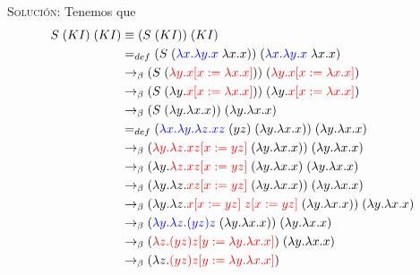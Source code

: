 \documentclass[letterpaper,11pt]{article}
\begin{document}
\begin{enumerate}
\begin{enumerate}
        \textsc{Solución:} Tenemos que 
        \begin{align*}
            S \; (KI) \; (KI) 
            &\equiv (S \; (KI)) \; (KI) \\ 
            &=_{def} (S \; (\textcolor{blue}{\lambda x. \lambda y.x} \; 
                            \lambda x.x)) \;
                           (\textcolor{blue}{\lambda x. \lambda y.x} \; 
                            \lambda x.x) \\
            &\rightarrow_{\beta}
            (S \; (\textcolor{red}{\lambda y.x [x := \lambda x.x]})) \;
            (\textcolor{red}{\lambda y.x [x := \lambda x.x]}) \\
            &\rightarrow_{\beta}
            (S \; (\lambda y. \textcolor{red}{x [x := \lambda x.x]})) \; 
            (\lambda y. \textcolor{red}{x [x := \lambda x.x]}) \\
            &\rightarrow_{\beta} 
            (S \; (\lambda y. \lambda x.x)) \; (\lambda y. \lambda x.x) \\
            &=_{def} (\textcolor{blue}{\lambda x. \lambda y. \lambda z.xz} \; 
                     (yz) \; (\lambda y. \lambda x.x)) \; 
                     (\lambda y. \lambda x.x) \\
            &\rightarrow_{\beta}
            (\textcolor{red}{\lambda y. \lambda z.xz [x := yz]} \; 
            (\lambda y. \lambda x.x)) \; (\lambda y. \lambda x.x) \\
            &\rightarrow_{\beta}
            (\lambda y. \textcolor{red}{\lambda z.xz [x := yz]} \; 
            (\lambda y. \lambda x.x) \; (\lambda y. \lambda x.x) \\ 
            &\rightarrow_{\beta}
            (\lambda y. \lambda z. \textcolor{red}{xz [x := yz]} \; 
            (\lambda y. \lambda x.x)) \; (\lambda y. \lambda x.x) \\
            &\rightarrow_{\beta}
            (\lambda y. \lambda z. \textcolor{red}{x [x := yz] \; z [x := yz]} 
            \; (\lambda y. \lambda x.x)) \; (\lambda y. \lambda x.x) \\
            &\rightarrow_{\beta}
            (\textcolor{blue}{\lambda y. \lambda z.(yz)z} \; 
            (\lambda y. \lambda x.x)) \; (\lambda y. \lambda x.x) \\
            &\rightarrow_{\beta}
            (\textcolor{red}{\lambda z.(yz)z [y := \lambda y. \lambda x.x]}) 
            \; (\lambda y. \lambda x.x) \\
            &\rightarrow_{\beta}
            (\lambda z. \textcolor{red}{(yz)z [y := \lambda y. \lambda x.x]}) 

\end{align*}
\end{enumerate}
\end{enumerate}
\end{document}
